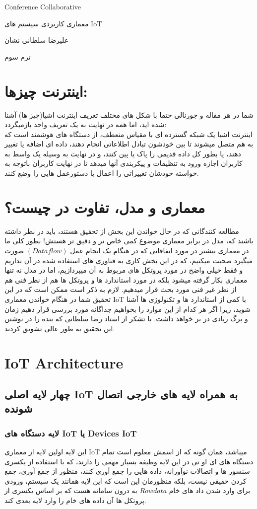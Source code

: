 \documentclass[10pt, a4paper]{article}
\begin{document}
\centerline{Conference Collaborative}
\centerline{معماری کاربردی سیستم های IoT}
\centerline{علیرضا سلطانی نشان}
\centerline{ترم سوم}
\date{\today}
\tableofcontents

\newpage
\section{اینترنت چیزها:}
شما در هر مقاله و جورنالی حتما با شکل های مختلف تعریف اینترنت اشیا(چیز ها) آشنا شده اید، اما همه در نهایت به یک تعریف واحد بازمیگردد:\\
اینترنت اشیا
یک شبکه گسترده ای با مقیاس منعطف، از دستگاه های هوشمند است که به هم متصل میشوند تا بین خودشون تبادل اطلاعاتی انجام دهند، داده ای اضافه یا تغییر دهند، یا بطور کل داده قدیمی را پاک یا پین کنند، و در نهایت به وسیله یک واسط به کاربران اجازه ورود به تنظیمات و پیکربندی آنها میدهد تا در نهایت کاربران باتوجه به خواسته خودشان تغییراتی را اعمال یا دستورعمل هایی را وضع کنند.
\section{معماری و مدل، تفاوت در چیست؟}
مطالعه کنندگانی که در حال خواندن این بخش از تحقیق هستند، باید در نظر داشته باشند که، مدل در برابر معماری موضوع کمی خاص تر و دقیق تر هستش! بطور
کلی ما در معماری بیشتر در مورد اتفاقاتی که در هنگام یک انجام عمل $(Data flow)$ صورت میگیرد صحبت میکنیم، که در این بخش کاری به فناوری های استفاده شده در آن نداریم و فقط خیلی واضح در مورد پروتکل های مربوط به آن میپردازیم، اما در مدل نه تنها معماری بکار گرفته میشود بلکه در مورد استاندارد ها و پروتکل ها هم از نظر فنی هم از نظر غیر فنی مورد بحث قرار میدهیم. لازم به ذکر است ممکن است که در این تحقیق شما در هنگام خواندن معماری IoT با کمی از استاندارد ها و تکنولوژی ها آشنا شوید، زیرا اگر هر کدام از این موارد را بخواهیم جداگانه مورد بررسی قرار دهیم زمان و برگ زیادی در بر خواهد داشت.
با تشکر از استاد رضا سلطانی که بنده را در نوشتن این تحقیق به طور
عالی تشویق کردند.
\\


\section{IoT Architecture}
\subsection{چهار لایه اصلی IoT به همراه لایه های خارجی اتصال شونده}
\subsubsection{لایه دستگاه های IoT یا Devices IoT}
این لایه اولین لایه از معماری IoT میباشد، همان گونه که از اسمش معلوم است تمام دستگاه های ای او تی در این لایه وظیفه بسیار مهمی را دارند، که با استفاده از یکسری سنسور ها و اتصالات نوآورانه، داده هایی را جمع آوری کنند، منظور از جمع آوری، جمع کردن حقیقی نیست، بلکه منظورمان این است که این لایه همانند یک سیستم، ورودی برای وارد شدن داد های خام $Row data$ به درون سامانه هست که بر اساس یکسری از پروتکل ها آن داده های خام را وارد لایه بعدی کند.
\end{document}
